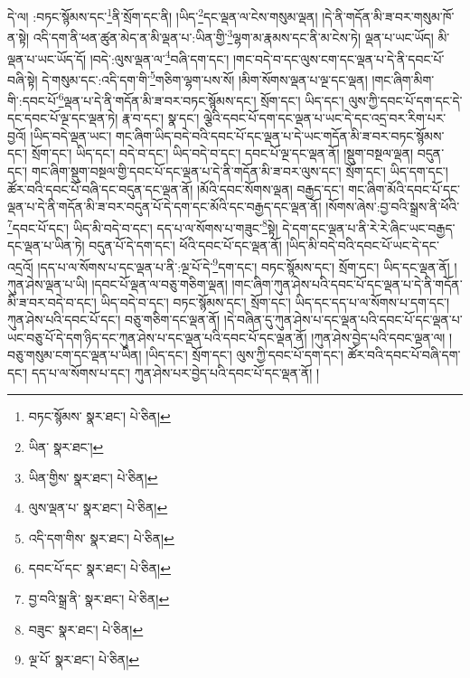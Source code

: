 དེ་ལ། :བཏང་སྙོམས་དང་\footnote{བཏང་སྙོམས་  སྣར་ཐང་།  པེ་ཅིན། }ནི་སྲོག་དང་ནི། །ཡིད་\footnote{ཡིན་  སྣར་ཐང་། }དང་ལྡན་ལ་ངེས་གསུམ་ལྡན། །དེ་ནི་གདོན་མི་ཟ་བར་གསུམ་ཁོ་ན་སྟེ། འདི་དག་ནི་ཕན་ཚུན་མེད་ན་མི་ལྡན་པ་:ཡིན་གྱི་\footnote{ཡིན་གྱིས་  སྣར་ཐང་།  པེ་ཅིན། }ལྷག་མ་རྣམས་དང་ནི་མ་ངེས་ཏེ། ལྡན་པ་ཡང་ཡོད། མི་ལྡན་པ་ཡང་ཡོད་དོ། །བདེ་:ལུས་ལྡན་ལ་\footnote{ལུས་ལྡན་པ་  སྣར་ཐང་།  པེ་ཅིན། }བཞི་དག་དང་། །གང་བདེ་བ་དང་ལུས་ངག་དང་ལྡན་པ་དེ་ནི་དབང་པོ་བཞི་སྟེ། དེ་གསུམ་དང་:འདི་དག་གི་\footnote{འདི་དག་གིས་  སྣར་ཐང་།  པེ་ཅིན། }གཅིག་ལྷག་པས་སོ། །མིག་སོགས་ལྡན་པ་ལྔ་དང་ལྡན། །གང་ཞིག་མིག་གི་:དབང་པོ་\footnote{དབང་པོ་དང་  སྣར་ཐང་།  པེ་ཅིན། }ལྡན་པ་དེ་ནི་གདོན་མི་ཟ་བར་བཏང་སྙོམས་དང་། སྲོག་དང་། ཡིད་དང་། ལུས་ཀྱི་དབང་པོ་དག་དང་དེ་དང་དབང་པོ་ལྔ་དང་ལྡན་ཏེ། རྣ་བ་དང་། སྣ་དང་། ལྕེའི་དབང་པོ་དག་དང་ལྡན་པ་ཡང་དེ་དང་འདྲ་བར་རིག་པར་བྱའོ། །ཡིད་བདེ་ལྡན་ཡང་། གང་ཞིག་ཡིད་བདེ་བའི་དབང་པོ་དང་ལྡན་པ་དེ་ཡང་གདོན་མི་ཟ་བར་བཏང་སྙོམས་དང་། སྲོག་དང་། ཡིད་དང་། བདེ་བ་དང་། ཡིད་བདེ་བ་དང་། དབང་པོ་ལྔ་དང་ལྡན་ནོ། །སྡུག་བསྔལ་ལྡན། བདུན་དང་། གང་ཞིག་སྡུག་བསྔལ་གྱི་དབང་པོ་དང་ལྡན་པ་དེ་ནི་གདོན་མི་ཟ་བར་ལུས་དང་། སྲོག་དང་། ཡིད་དག་དང་། ཚོར་བའི་དབང་པོ་བཞི་དང་བདུན་དང་ལྡན་ནོ། །མོའི་དབང་སོགས་ལྡན། བརྒྱད་དང་། གང་ཞིག་མོའི་དབང་པོ་དང་ལྡན་པ་དེ་ནི་གདོན་མི་ཟ་བར་བདུན་པོ་དེ་དག་དང་མོའི་དང་བརྒྱད་དང་ལྡན་ནོ། །སོགས་ཞེས་:བྱ་བའི་སྒྲས་ནི་ཕོའི་\footnote{བྱ་བའི་སྒྲ་ནི་  སྣར་ཐང་།  པེ་ཅིན། }དབང་པོ་དང་། ཡིད་མི་བདེ་བ་དང་། དད་པ་ལ་སོགས་པ་གཟུང་\footnote{བཟུང་  སྣར་ཐང་།  པེ་ཅིན། }སྟེ། དེ་དག་དང་ལྡན་པ་ནི་རེ་རེ་ཞིང་ཡང་བརྒྱད་དང་ལྡན་པ་ཡིན་ཏེ། བདུན་པོ་དེ་དག་དང་། ཕོའི་དབང་པོ་དང་ལྡན་ནོ། །ཡིད་མི་བདེ་བའི་དབང་པོ་ཡང་དེ་དང་འདྲའོ། །དད་པ་ལ་སོགས་པ་དང་ལྡན་པ་ནི་:ལྔ་པོ་དེ་\footnote{ལྔ་པོ་  སྣར་ཐང་།  པེ་ཅིན། }དག་དང་། བཏང་སྙོམས་དང་། སྲོག་དང་། ཡིད་དང་ལྡན་ནོ། །ཀུན་ཤེས་ལྡན་པ་ཡི། །དབང་པོ་ལྡན་ལ་བཅུ་གཅིག་ལྡན། །གང་ཞིག་ཀུན་ཤེས་པའི་དབང་པོ་དང་ལྡན་པ་དེ་ནི་གདོན་མི་ཟ་བར་བདེ་བ་དང་། ཡིད་བདེ་བ་དང་། བཏང་སྙོམས་དང་། སྲོག་དང་། ཡིད་དང་དད་པ་ལ་སོགས་པ་དག་དང་། ཀུན་ཤེས་པའི་དབང་པོ་དང་། བཅུ་གཅིག་དང་ལྡན་ནོ། །དེ་བཞིན་དུ་ཀུན་ཤེས་པ་དང་ལྡན་པའི་དབང་པོ་དང་ལྡན་པ་ཡང་བཅུ་པོ་དེ་དག་ཉིད་དང་ཀུན་ཤེས་པ་དང་ལྡན་པའི་དབང་པོ་དང་ལྡན་ནོ། །ཀུན་ཤེས་བྱེད་པའི་དབང་ལྡན་ལ། །བཅུ་གསུམ་ངག་དང་ལྡན་པ་ཡིན། །ཡིད་དང་། སྲོག་དང་། ལུས་ཀྱི་དབང་པོ་དག་དང་། ཚོར་བའི་དབང་པོ་བཞི་དག་དང་། དད་པ་ལ་སོགས་པ་དང་། ཀུན་ཤེས་པར་བྱེད་པའི་དབང་པོ་དང་ལྡན་ནོ། །
